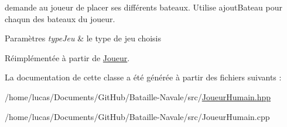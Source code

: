 demande au joueur de placer ses différents bateaux. Utilise ajout\+Bateau pour chaqun des bateaux du joueur. 


\begin{DoxyParams}{Paramètres}
{\em type\+Jeu} & le type de jeu choisis \\
\hline
\end{DoxyParams}


Réimplémentée à partir de \hyperlink{class_joueur_aa97f71a90328693e0047ba2f48d61b4b}{Joueur}.



La documentation de cette classe a été générée à partir des fichiers suivants \+:\begin{DoxyCompactItemize}
\item 
/home/lucas/\+Documents/\+Git\+Hub/\+Bataille-\/\+Navale/src/\hyperlink{_joueur_humain_8hpp}{Joueur\+Humain.\+hpp}\item 
/home/lucas/\+Documents/\+Git\+Hub/\+Bataille-\/\+Navale/src/Joueur\+Humain.\+cpp\end{DoxyCompactItemize}
